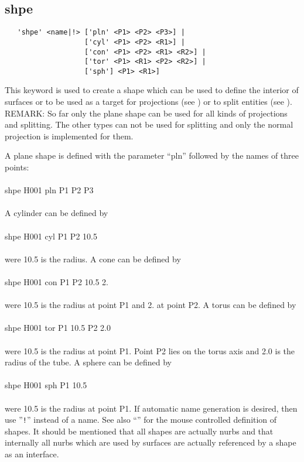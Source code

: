 \documentclass{article}
\begin{document}
\subsection{\label{shpe}shpe}
\begin{verbatim}
   'shpe' <name|!> ['pln' <P1> <P2> <P3>] |
                   ['cyl' <P1> <P2> <R1>] |
                   ['con' <P1> <P2> <R1> <R2>] |
                   ['tor' <P1> <R1> <P2> <R2>] |
                   ['sph'] <P1> <R1>]
\end{verbatim}
This keyword is used to create a shape which can be used to define the interior of surfaces or to be used as a target for projections (see ) or to split entities (see ). REMARK: So far only the plane shape can be used for all kinds of projections and splitting. The other types can not be used for splitting and only the normal projection is implemented for them.

A plane shape is defined with the parameter ``pln'' followed by the names of three points:\\\\shpe H001 pln P1 P2 P3\\\\A cylinder can be defined by\\\\shpe H001 cyl P1 P2 10.5\\\\were 10.5 is the radius. A cone can be defined by\\\\shpe H001 con P1 P2 10.5 2.\\\\were 10.5 is the radius at point P1 and 2. at point P2. A torus can be defined by\\\\shpe H001 tor P1 10.5 P2 2.0\\\\were 10.5 is the radius at point P1. Point P2 lies on the torus axis and 2.0 is the radius of the tube. A sphere can be defined by\\\\shpe H001 sph P1 10.5\\\\were 10.5 is the radius at point P1. If automatic name generation is desired, then use ''\verb_!_'' instead of a name. See also ``'' for the mouse controlled definition of shapes. It should be mentioned that all shapes are actually nurbs and that internally all nurbs which are used by surfaces are actually referenced by a shape as an interface.
\end{document}
